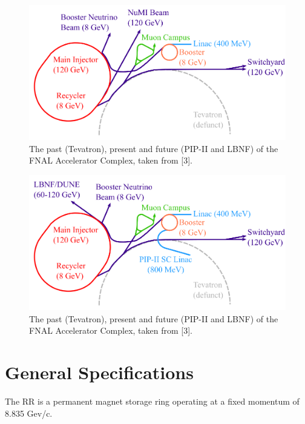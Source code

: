 \begin{figure}[H]
   \centering
   \includegraphics[width=\columnwidth]{chapter3/complex.png}
   \caption{The past (Tevatron), present and future (PIP-II and LBNF) of the FNAL Accelerator Complex, taken from [3].}
   \label{fig:fnal}
\end{figure}

\begin{figure}[H]
   \centering
   \includegraphics[width=\columnwidth]{chapter3/complexPIPII.png}
   \caption{The past (Tevatron), present and future (PIP-II and LBNF) of the FNAL Accelerator Complex, taken from [3].}
   \label{fig:fnalpip2}
\end{figure}

\section{General Specifications}

The RR is a permanent magnet storage ring operating at a fixed momentum of 8.835 Gev/c.
\cite{pipII1} \cite{rr2}

